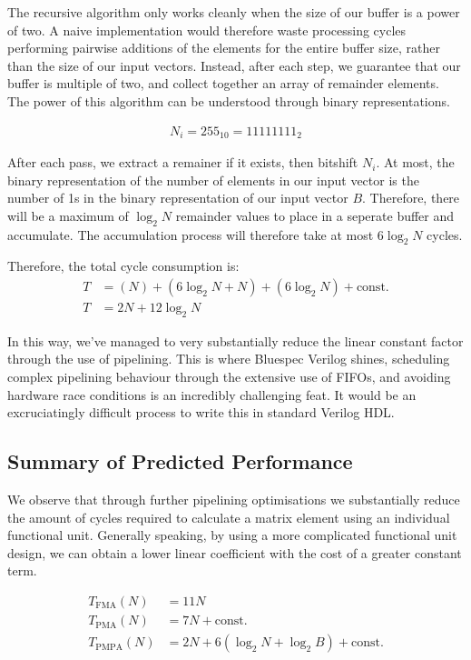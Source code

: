 \documentclass[a4paper,8pt]{report}
\begin{document}
The recursive algorithm only works cleanly when the size of our buffer is a
power of two. A naive implementation would therefore waste processing cycles
performing pairwise additions of the elements for the entire buffer size, rather
than the size of our input vectors. Instead, after each step, we guarantee that
our buffer is multiple of two, and collect together an array of remainder
elements. The power of this algorithm can be understood through binary
representations.

\begin{align*}
  N_i = 255_{10} = 11111111_{2}
\end{align*}

After each pass, we extract a remainer if it exists, then bitshift $N_i$. At
most, the binary representation of the number of elements in our input vector is
the number of 1s in the binary representation of our input vector $B$. Therefore, there will
be a maximum of $\log_{2}{N}$ remainder values to place in a seperate buffer and
accumulate. The accumulation process will therefore take at most $6\log_{2}{N}$ cycles.

Therefore, the total cycle consumption is:
\begin{align*}
  T &= (N) + (6\log_2{N} + N) + (6\log_2{N}) + \text{const.} \\
  T &= 2N + 12\log_2{N}
\end{align*}

In this way, we've managed to very substantially reduce the linear constant
factor through the use of pipelining. This is where Bluespec Verilog shines,
scheduling complex pipelining behaviour through the extensive use of FIFOs, and
avoiding hardware race conditions is an incredibly challenging feat. It would be
an excruciatingly difficult process to write this in standard Verilog HDL. 

\subsection{Summary of Predicted Performance}
We observe that through further pipelining optimisations we substantially reduce
the amount of cycles required to calculate a matrix element using an individual
functional unit. Generally speaking, by using a more complicated functional unit
design, we can obtain a lower linear coefficient with the cost of a greater
constant term.

\begin{align*}
  T_{\text{FMA}}(N) &= 11N \\
  T_{\text{PMA}}(N) &= 7N + \text{const.}  \\
  T_{\text{PMPA}}(N) &= 2N + 6(\log_2{N} + \log_2{B}) + \text{const.}
\end{align*}
\end{document}
